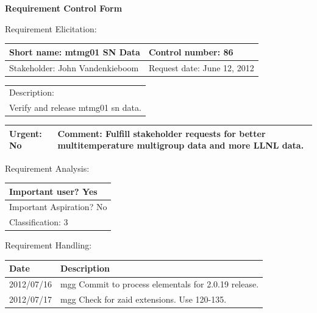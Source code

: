 \begin{center}\Large\bf
Requirement Control Form
\end{center}
\vspace{24pt}

Requirement Elicitation:

\begin{tabular}{|p{211pt}|p{211pt}|} \hline
Short name: mtmg01 SN Data & Control number: 86\\ \hline
Stakeholder: John Vandenkieboom & Request date: June 12, 2012\\
\end{tabular}
\begin{tabular}{|p{433pt}|} \hline
Description: \\ 
Verify and release mtmg01 sn data.\\ 
\hline
\end{tabular} 
\begin{tabular}{|p{211pt}|p{211pt}|} \hline
Urgent: No & Comment: Fulfill stakeholder requests for better
multitemperature multigroup data
and more LLNL data. \\ \hline
\end{tabular}

\vspace{24pt}

Requirement Analysis:

\begin{tabular}{|p{433pt}|} \hline
Important user? Yes \\ \hline
Important Aspiration? No \\ \hline
Classification: 3 \\ \hline
\end{tabular}

\vspace{24pt}

Requirement Handling:

\begin{tabular}{|p{72pt}|p{351pt}|} \hline
Date & Description \\ \hline
2012/07/16 & mgg Commit to process elementals for 2.0.19 release. \\ \hline 
2012/07/17 & mgg Check for zaid extensions.  Use 120-135. \\ \hline 
\end{tabular}
